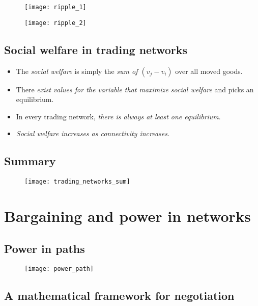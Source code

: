 \begin{figure}[H]
    \centering
    \texttt{[image: ripple\_1]}
\end{figure}

\begin{figure}[H]
    \centering
    \texttt{[image: ripple\_2]}
\end{figure}

\subsection{Social welfare in trading networks}

\begin{itemize}
\item The \textit{social welfare} is simply the \textit{sum of $(v_j - v_i)$} over all moved goods.
\item There \textit{exist values for the variable that maximize social welfare} and picks an equilibrium.
\item In every trading network, \textit{there is always at least one equilibrium}.
\item \textit{Social welfare increases as connectivity increases.}
\end{itemize}

\subsection{Summary}

\begin{figure}[H]
    \centering
    \texttt{[image: trading\_networks\_sum]}
\end{figure}

\section{Bargaining and power in networks}

\subsection{Power in paths}

\begin{figure}[H]
    \centering
    \texttt{[image: power\_path]}
\end{figure}

\subsection{A mathematical framework for negotiation}

